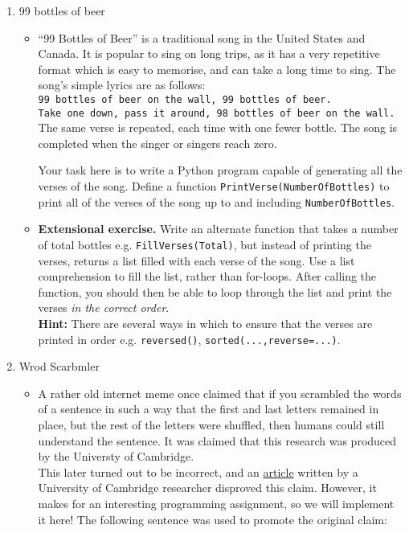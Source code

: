 \documentclass[11pt]{report}
\begin{document}
\begin{enumerate}
	\item 99 bottles of beer
	\begin{itemize}
		\item ``99 Bottles of Beer'' is a traditional song in the United States and Canada. It is popular to sing on long trips, as it has a very repetitive format which is easy to memorise, and can take a long time to sing. The song’s simple lyrics are as follows:\\

		{\tt 99 bottles of beer on the wall, 99 bottles of beer.}\\
		{\tt Take one down, pass it around, 98 bottles of beer on the wall.}\\

		The same verse is repeated, each time with one fewer bottle. The song is completed when the singer or singers reach zero.

		Your task here is to write a Python program capable of generating all the verses of the song. Define a function {\tt PrintVerse(NumberOfBottles)} to print all of the verses of the song up to and including {\tt NumberOfBottles}.

		\item \textbf{Extensional exercise.} Write an alternate function that takes a number of total bottles e.g. {\tt FillVerses(Total)}, but instead of printing the verses, returns a list filled with each verse of the song. Use a list comprehension to fill the list, rather than for-loops. After calling the function, you should then be able to loop through the list and print the verses \emph{in the correct order}. \\
		\textbf{Hint:} There are several ways in which to ensure that the verses are printed in order e.g. {\tt reversed()}, {\tt sorted(...,reverse=...)}.
	\end{itemize}

	\item Wrod Scarbmler
	\begin{itemize}
		\item A rather old internet meme once claimed that if you scrambled the words of a sentence in such a way that the first and last letters remained in place, but the rest of the letters were shuffled, then humans could still understand the sentence. It was claimed that this research was produced by the Universty of Cambridge. \\

		This later turned out to be incorrect, and an \href{http://www.mrc-cbu.cam.ac.uk/people/matt.davis/cmabridge/}{article} written by a University of Cambridge researcher disproved this claim. However, it makes for an interesting programming assignment, so we will implement it here!
		The following sentence was used to promote the original claim:\\


\end{itemize}
\end{enumerate}
\end{document}
